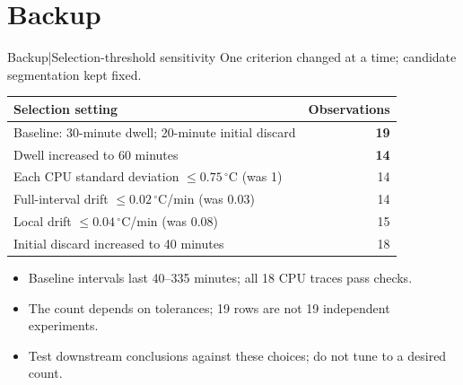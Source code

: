 \section{Backup}

\begin{frame}{Backup\enspace|\enspace Selection-threshold sensitivity}
  \small One criterion changed at a time; candidate segmentation kept fixed.
  \par\medskip
  {\renewcommand{\arraystretch}{1.35}
  \begin{tabular*}{\textwidth}{@{\extracolsep{\fill}}lr@{}}
    \toprule
    \textbf{Selection setting} & \textbf{Observations}\\
    \midrule
    Baseline: 30-minute dwell; 20-minute initial discard & \textbf{19}\\
    Dwell increased to 60 minutes & \textbf{14}\\
    Each CPU standard deviation $\leq0.75\,{}^\circ$C (was 1) & 14\\
    Full-interval drift $\leq0.02\,{}^\circ$C/min (was 0.03) & 14\\
    Local drift $\leq0.04\,{}^\circ$C/min (was 0.08) & 15\\
    Initial discard increased to 40 minutes & 18\\
    \bottomrule
  \end{tabular*}}
  \medskip
  \begin{itemize}
    \item Baseline intervals last 40--335 minutes; all 18 CPU traces pass checks.
    \item The count depends on tolerances; 19 rows are not 19 independent experiments.
    \item Test downstream conclusions against these choices; do not tune to a desired count.
  \end{itemize}
\end{frame}

